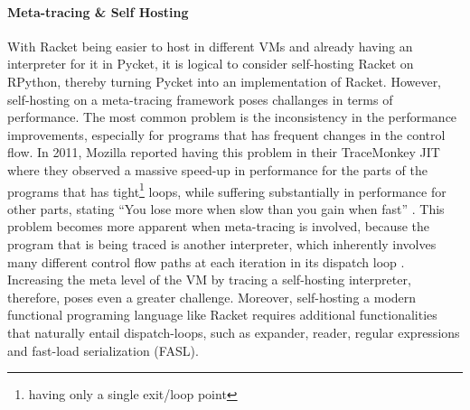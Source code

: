 \label{subsec:self-hosting-problem}

\vspace{-0.4cm}

\paragraph{Meta-tracing \& Self Hosting} With Racket being easier to host in different VMs and already having
an interpreter for it in Pycket, it is logical to consider
self-hosting Racket on RPython, thereby turning Pycket into an
implementation of Racket. However, self-hosting on a meta-tracing
framework poses challanges in terms of performance. The most common
problem is the inconsistency in the performance improvements,
especially for programs that has frequent changes in the control
flow. In 2011, Mozilla reported having this problem in their
TraceMonkey JIT where they observed a massive speed-up in performance
for the parts of the programs that has tight\footnote{having only a
  single exit/loop point} loops, while suffering substantially in
performance for other parts, stating ``You lose more when slow than
you gain when fast'' \cite{mozblog}. This problem becomes more
apparent when meta-tracing is involved, because the program that is
being traced is another interpreter, which inherently involves many
different control flow paths at each iteration in its dispatch loop
\cite{bolz15-meta-vm}. Increasing the meta level of the VM by tracing
a self-hosting interpreter, therefore, poses even a greater
challenge. Moreover, self-hosting a modern functional programing
language like Racket requires additional functionalities that
naturally entail dispatch-loops, such as expander, reader, regular
expressions and fast-load serialization (FASL).
